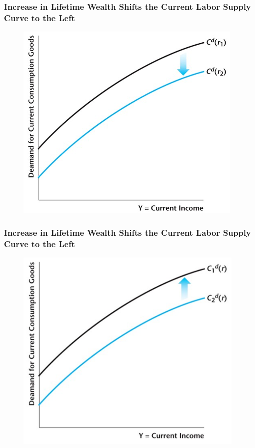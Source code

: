 \documentclass{beamer}
\begin{document}
\begin{frame}
\frametitle[alignment=center]{Increase in Lifetime Wealth Shifts the Current Labor Supply Curve to the Left}
\begin{figure}
\centering
\includegraphics[scale=0.6]{Figures/W_Fig_11pt5.png}
\end{figure}
\end{frame}

\begin{frame}
\frametitle[alignment=center]{Increase in Lifetime Wealth Shifts the Current Labor Supply Curve to the Left}
\begin{figure}
\centering
\includegraphics[scale=0.6]{Figures/W_Fig_11pt6.png}
\end{figure}
\end{frame}
\end{document}
